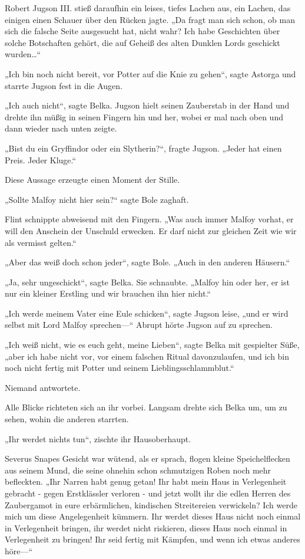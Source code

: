 {Robert Jugson III. stieß daraufhin ein leises, tiefes Lachen aus, ein Lachen, das einigen einen Schauer über den Rücken jagte. „Da fragt man sich schon, ob man sich die falsche Seite ausgesucht hat, nicht wahr? Ich habe Geschichten über solche Botschaften gehört, die auf Geheiß des alten Dunklen Lords geschickt wurden…“

„Ich bin noch nicht bereit, vor Potter auf die Knie zu gehen“, sagte Astorga und starrte Jugson fest in die Augen.

„Ich auch nicht“, sagte Belka. Jugson hielt seinen Zauberstab in der Hand und drehte ihn müßig in seinen Fingern hin und her, wobei er mal nach oben und dann wieder nach unten zeigte.

„Bist du ein Gryffindor oder ein Slytherin?“, fragte Jugson. „Jeder hat einen Preis. Jeder Kluge.“

Diese Aussage erzeugte einen Moment der Stille.

„Sollte Malfoy nicht hier sein?“ sagte Bole zaghaft.

Flint schnippte abweisend mit den Fingern. „Was auch immer Malfoy vorhat, er will den Anschein der Unschuld erwecken. Er darf nicht zur gleichen Zeit wie wir als vermisst gelten.“

„Aber das weiß doch schon jeder“, sagte Bole. „Auch in den anderen Häusern.“

„Ja, sehr ungeschickt“, sagte Belka. Sie schnaubte. „Malfoy hin oder her, er ist nur ein kleiner Erstling und wir brauchen ihn hier nicht.“

„Ich werde meinem Vater eine Eule schicken“, sagte Jugson leise, „und er wird selbst mit Lord Malfoy sprechen—“ Abrupt hörte Jugson auf zu sprechen.

„Ich weiß nicht, wie es euch geht, meine Lieben“, sagte Belka mit gespielter Süße, „aber ich habe nicht vor, vor einem falschen Ritual davonzulaufen, und ich bin noch nicht fertig mit Potter und seinem Lieblingsschlammblut.“

Niemand antwortete.

Alle Blicke richteten sich an ihr vorbei. Langsam drehte sich Belka um, um zu sehen, wohin die anderen starrten.

„Ihr werdet nichts tun“, zischte ihr Hausoberhaupt.

Severus Snapes Gesicht war wütend, als er sprach, flogen kleine Speichelflecken aus seinem Mund, die seine ohnehin schon schmutzigen Roben noch mehr befleckten. „Ihr Narren habt genug getan! Ihr habt mein Haus in Verlegenheit gebracht - gegen Erstklässler verloren - und jetzt wollt ihr die edlen Herren des Zaubergamot in eure erbärmlichen, kindischen Streitereien verwickeln? Ich werde mich um diese Angelegenheit kümmern. Ihr werdet dieses Haus nicht noch einmal in Verlegenheit bringen, ihr werdet nicht riskieren, dieses Haus noch einmal in Verlegenheit zu bringen! Ihr seid fertig mit Kämpfen, und wenn ich etwas anderes höre—“

}
